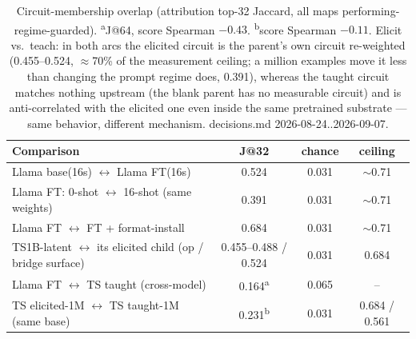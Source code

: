 \begin{table}[t]
\centering
\begin{tabular}{lccc}
\hline
Comparison & J@32 & chance & ceiling \\
\hline
Llama base(16s) $\leftrightarrow$ Llama FT(16s) & 0.524 & 0.031 & $\sim$0.71 \\
Llama FT: 0-shot $\leftrightarrow$ 16-shot (same weights) & 0.391 & 0.031 & $\sim$0.71 \\
Llama FT $\leftrightarrow$ FT + format-install & 0.684 & 0.031 & $\sim$0.71 \\
TS1B-latent $\leftrightarrow$ its elicited child (op / bridge surface) & 0.455--0.488 / 0.524 & 0.031 & 0.684 \\
Llama FT $\leftrightarrow$ TS taught (cross-model) & 0.164\textsuperscript{a} & 0.065 & -- \\
TS elicited-1M $\leftrightarrow$ TS taught-1M (same base) & 0.231\textsuperscript{b} & 0.031 & 0.684 / 0.561 \\
\hline
\end{tabular}
\caption{Circuit-membership overlap (attribution top-32 Jaccard, all maps performing-regime-guarded). \textsuperscript{a}J@64, score Spearman $-0.43$. \textsuperscript{b}score Spearman $-0.11$. Elicit vs.\ teach: in both arcs the elicited circuit is the parent's own circuit re-weighted (0.455--0.524, $\approx$70\% of the measurement ceiling; a million examples move it less than changing the prompt regime does, 0.391), whereas the taught circuit matches nothing upstream (the blank parent has no measurable circuit) and is anti-correlated with the elicited one even inside the same pretrained substrate --- same behavior, different mechanism. decisions.md 2026-08-24..2026-09-07.}
\label{tab:circuit_overlap}
\end{table}
